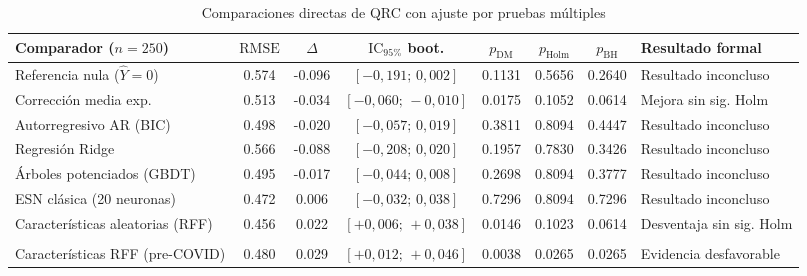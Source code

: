 \begin{table}[htbp]
	\centering
	\caption{Comparaciones directas de QRC con ajuste por pruebas múltiples}
	\label{tab:etapa8_holm}
	\scriptsize
	\setlength{\tabcolsep}{3.5pt}
	\renewcommand{\arraystretch}{1.14}
	\begin{tabular}{@{}>{\raggedright\arraybackslash}p{3.1cm}S[table-format=1.3]S[table-format=-1.3]cS[table-format=1.4]S[table-format=1.4]S[table-format=1.4]>{\raggedright\arraybackslash}p{2.7cm}@{}}
		\toprule
		Comparador (\(n=250\)) & {\(\text{RMSE}\)} & {\(\Delta\)} & {\(\text{IC}_{95\%}\) boot.} & {\(p_{\text{DM}}\)} & {\(p_{\text{Holm}}\)} & {\(p_{\text{BH}}\)} & Resultado formal\\
		\midrule
		Referencia nula (\(\widehat{Y}=0\)) & 0.574 & -0.096 & \([-0{,}191;\, 0{,}002]\) & 0.1131 & 0.5656 & 0.2640 & Resultado inconcluso\\
		Corrección media exp. & 0.513 & -0.034 & \([-0{,}060;\, -0{,}010]\) & 0.0175 & 0.1052 & 0.0614 & Mejora sin sig. Holm\\
		Autorregresivo AR (BIC) & 0.498 & -0.020 & \([-0{,}057;\, 0{,}019]\) & 0.3811 & 0.8094 & 0.4447 & Resultado inconcluso\\
		Regresión Ridge & 0.566 & -0.088 & \([-0{,}208;\, 0{,}020]\) & 0.1957 & 0.7830 & 0.3426 & Resultado inconcluso\\
		Árboles potenciados (GBDT) & 0.495 & -0.017 & \([-0{,}044;\, 0{,}008]\) & 0.2698 & 0.8094 & 0.3777 & Resultado inconcluso\\
		ESN clásica (20 neuronas) & 0.472 & 0.006 & \([-0{,}032;\, 0{,}038]\) & 0.7296 & 0.8094 & 0.7296 & Resultado inconcluso\\
		Características aleatorias (RFF) & 0.456 & 0.022 & \([+0{,}006;\, +0{,}038]\) & 0.0146 & 0.1023 & 0.0614 & Desventaja sin sig. Holm\\
		\midrule
		\\
		Características RFF (pre-COVID) & 0.480 & 0.029 & \([+0{,}012;\, +0{,}046]\) & 0.0038 & 0.0265 & 0.0265 & Evidencia desfavorable\\
		\bottomrule
	\end{tabular}
\end{table}

